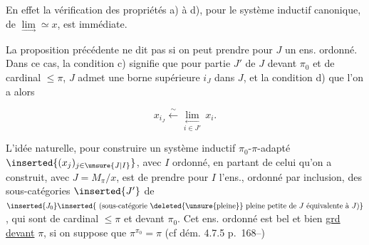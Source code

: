 
En effet la vérification des propriétés a) à d), pour le système inductif canonique, de $\underset{\longrightarrow}{\lim}\simeq x$, est immédiate.

La proposition précédente ne dit pas si on peut prendre pour $J$ un ens. ordonné. Dans ce cas, la condition c) signifie que pour  partie $J'$ de $J$  devant $\pi_0$ et de cardinal $\leq\pi$, $J$ admet une borne supérieure $i_J$ dans $J$, et la condition d) que l'on a alors

\[
x_{i_J}\xleftarrow{\sim}\underset{i\in J'}{\underset{\longleftarrow}{\lim}}\,x_i.
\]

L'idée naturelle, pour construire un système inductif $\pi_0$-$\pi$-adapté $\inserted{(x_j)_{j\in\unsure{J|I}}}$, avec $I$ ordonné, en partant de celui qu'on a construit, avec $J=M_\pi/x$, est de prendre pour $I$ l'ens., ordonné par inclusion, des sous-catégories $\inserted{J'}$ de $\inserted{J_0}\inserted{\text{ (sous-catégorie }\deleted{\text{\unsure{pleine}}}\text{ pleine petite de }J\text{ équivalente à }J\text{)}}$, qui sont de cardinal $\leq\pi$ et  devant $\pi_0$.  Cet ens. ordonné est bel et bien  \uline{grd devant} $\pi$, si on suppose que $\pi^{\pi_0}=\pi$ (cf dém. 4.7.5 p.~168--)

